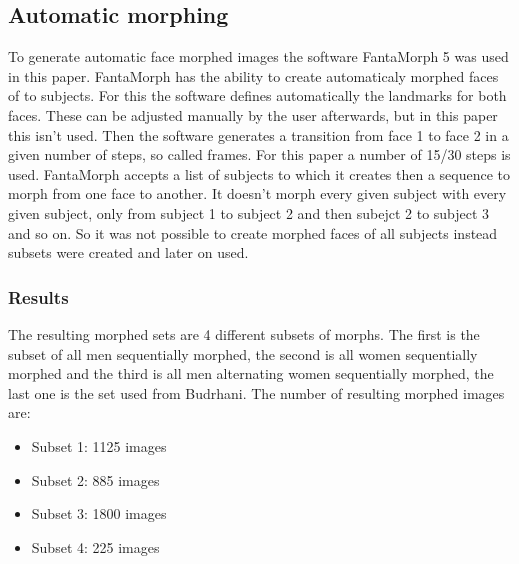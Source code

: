\subsection{Automatic morphing}
\label{automatic_morph}
To generate automatic face morphed images the software FantaMorph 5 was used in this paper. FantaMorph has the ability to create automaticaly morphed faces of to subjects. For this the software defines automatically the landmarks for both faces. These can be adjusted manually by the user afterwards, but in this paper this isn't used. Then the software generates a transition from face 1 to face 2 in a given number of steps, so called frames. For this paper a number of 15/30 steps is used. FantaMorph accepts a list of subjects to which it creates then a sequence to morph from one face to another. It doesn't morph every given subject with every given subject, only from subject 1 to subject 2 and then subejct 2 to subject 3 and so on. So it was not possible to create morphed faces of all subjects instead subsets were created and later on used.

\subsubsection{Results}
The resulting morphed sets are 4 different subsets of morphs. The first is the subset of all men sequentially morphed, the second is all women sequentially morphed and the third is all men alternating women sequentially morphed, the last one is the set used from Budrhani.
The number of resulting morphed images are:
\begin{itemize}
	\item Subset 1: 1125 images
	\item Subset 2: 885 images
	\item Subset 3: 1800 images
	\item Subset 4: 225 images
\end{itemize}


